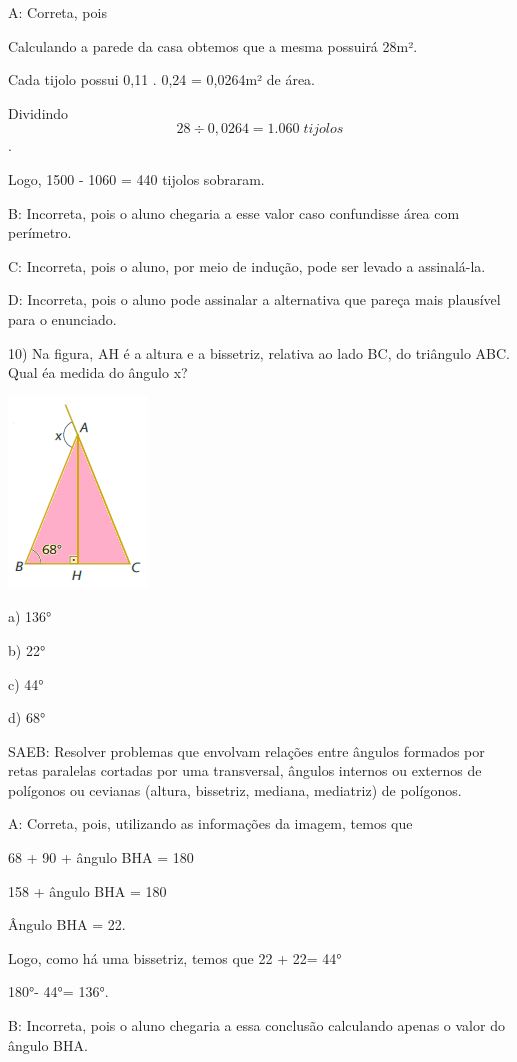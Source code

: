 A: Correta, pois

Calculando a parede da casa obtemos que a mesma possuirá 28m².

Cada tijolo possui 0,11 . 0,24 = 0,0264m² de área.

Dividindo \[28 \div 0,0264 = 1.060\; tijolos\].

Logo, 1500 - 1060 = 440 tijolos sobraram.

B: Incorreta, pois o aluno chegaria a esse valor caso confundisse área
com perímetro.

C: Incorreta, pois o aluno, por meio de indução, pode ser levado a
assinalá-la.

D: Incorreta, pois o aluno pode assinalar a alternativa que pareça mais
plausível para o enunciado.

10) Na figura, AH é a altura e a bissetriz, relativa ao lado BC, do
triângulo ABC. Qual éa medida do ângulo x?

\includegraphics[width=1.45833in,height=2in]{./imgSAEB_8_MAT/media/image58.png}

a) 136°

b) 22°

c) 44°

d) 68°

SAEB: Resolver problemas que envolvam relações entre ângulos formados
por retas paralelas cortadas por uma transversal, ângulos internos ou
externos de polígonos ou cevianas (altura, bissetriz, mediana,
mediatriz) de polígonos.

A: Correta, pois, utilizando as informações da imagem, temos que

68 + 90 + ângulo BHA = 180

158 + ângulo BHA = 180

Ângulo BHA = 22.

Logo, como há uma bissetriz, temos que 22 + 22= 44°

180°- 44°= 136°.

B: Incorreta, pois o aluno chegaria a essa conclusão calculando apenas o
valor do ângulo BHA.

